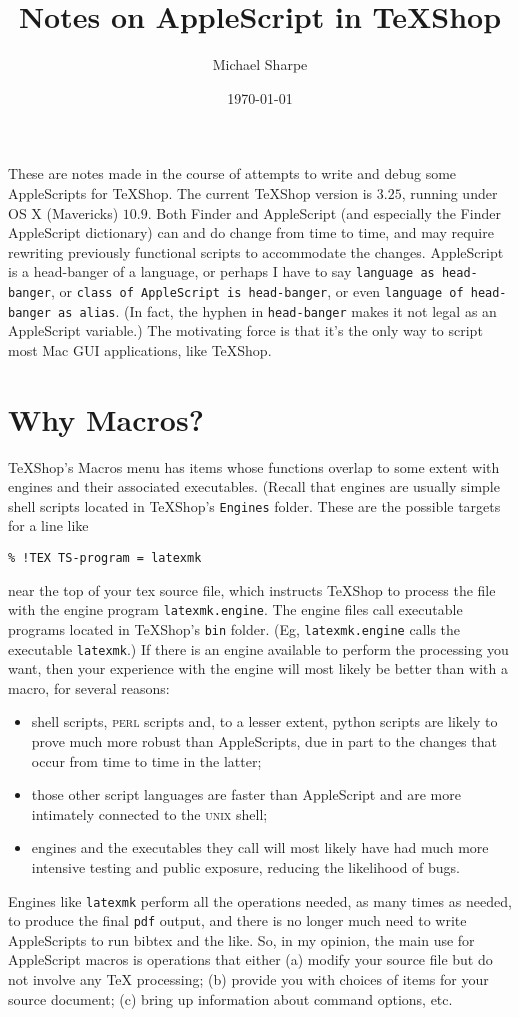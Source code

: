 \documentclass[11pt]{amsart}
\title{Notes on AppleScript in TeXShop}
\author{Michael Sharpe}
\date{\today}  %
\def\UNIX{\textsc{unix}\xspace}
\begin{document}
\maketitle
These are notes made in the course of attempts to write and debug some AppleScripts for  TeXShop. The current TeXShop version is $3.25$, running  under OS X (Mavericks) $10.9$. Both Finder and AppleScript (and especially the Finder AppleScript dictionary) can and do change from time to time, and may require rewriting previously functional scripts to accommodate the changes. AppleScript is a head-banger of a language, or perhaps I have to say  {\tt language as head-banger}, or {\tt class of AppleScript is head-banger}, or even {\tt language of head-banger as alias}.  (In fact, the hyphen in {\tt head-banger} makes it not legal as an AppleScript variable.) The motivating force is that it's the only way to script most Mac GUI applications, like TeXShop.

\section{Why Macros?}
TeXShop's Macros menu has items whose functions overlap to some extent with engines and their associated executables. (Recall that engines are usually simple shell scripts located in TeXShop's {\tt Engines} folder. These are the possible targets for a line like
\begin{verbatim}
% !TEX TS-program = latexmk
\end{verbatim}
near the top of your tex source file, which instructs TeXShop to process the file with the engine program {\tt latexmk.engine}. The engine files call executable programs located in TeXShop's {\tt bin} folder. (Eg, {\tt latexmk.engine} calls the executable {\tt latexmk}.)  If there is an engine available to perform the processing you want, then your experience with the engine will most likely be better than with a macro, for several reasons:
\begin{itemize}
\item
shell scripts, \textsc{perl} scripts and, to a lesser extent, python scripts are likely to prove much more robust than AppleScripts, due in part to the changes that occur from time to time in the latter;
\item those other script languages are faster than AppleScript and are more intimately connected to the \UNIX shell;
\item engines and the executables they call will most likely have had much more intensive testing and public exposure, reducing the likelihood of bugs.
\end{itemize}
Engines like {\tt latexmk} perform all the operations needed, as many times as needed, to produce the final {\tt pdf} output, and there is no longer much need to write AppleScripts to run bibtex and the like. So, in my opinion, the main use for AppleScript macros is operations that either (a) modify your source file but do not involve any TeX processing; (b) provide you with  choices of items for your source document; (c) bring up information about command options, etc.
\end{document}

